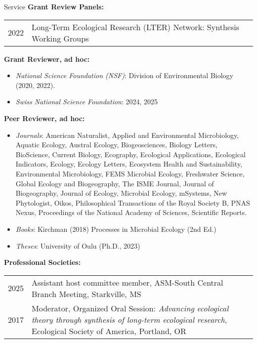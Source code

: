 \documentclass{resume} %
\begin{document}
\begin{rSection}{Service}
{\bf Grant Review Panels:}
\begin{xltabular}{0.95\textwidth}{l>{\raggedright\arraybackslash}X}

2022 & Long-Term Ecological Research (LTER) Network: Synthesis Working Groups
\end{xltabular}

{\bf Grant Reviewer, ad hoc:}
\begin{itemize}
  \item {\em National Science Foundation (NSF)}: Division of Environmental Biology (2020, 2022).
  \item {\em Swiss National Science Foundation}: 2024, 2025
\end{itemize}

\bigskip 
{\bf Peer Reviewer, ad hoc:}
\begin{itemize}
\item {\em Journals}: American Naturalist, Applied and Environmental Microbiology, Aquatic Ecology, Austral Ecology, Biogeosciences, Biology Letters, BioScience, Current Biology, Ecography, Ecological Applications, Ecological Indicators, Ecology, Ecology Letters, Ecosystem Health and Sustainability, Environmental Microbiology, FEMS Microbial Ecology, Freshwater Science, Global Ecology and Biogeography, The ISME Journal, Journal of Biogeography, Journal of Ecology, Microbial Ecology, mSystems, New Phytologist, Oikos, Philosophical Transactions of the Royal Society B, PNAS Nexus, Proceedings of the National Academy of Sciences, Scientific Reports.

\item {\em Books}: Kirchman (2018) Processes in Microbial Ecology (2nd Ed.)

\item {\em Theses}: University of Oulu (Ph.D., 2023)
\end{itemize}

\bigskip
\newpage
{\bf Professional Societies:}
{\def\arraystretch{1}
\begin{xltabular}{0.95\textwidth}{l>{\raggedright\arraybackslash}X}
2025 & Assistant host committee member, ASM-South Central Branch Meeting, Starkville, MS\\

2017 & Moderator, Organized Oral Session: {\em Advancing ecological theory through synthesis of long-term ecological research}, Ecological Society of America, Portland, OR\\
\end{xltabular}
}


\end{rSection}
\end{document}
